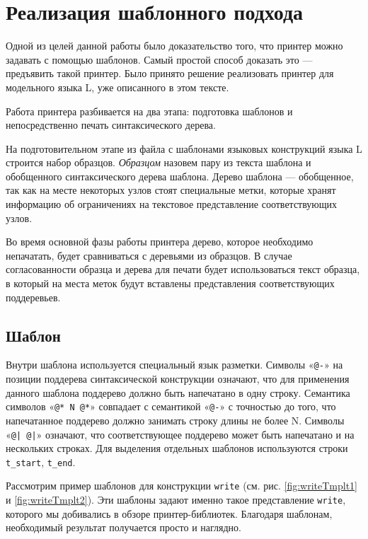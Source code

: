 \section{Реализация шаблонного подхода}

Одной из целей данной работы было доказательство того, что принтер можно задавать с помощью шаблонов.
Самый простой способ доказать это --- предъявить такой принтер. Было принято решение реализовать принтер для модельного языка L, уже описанного в этом тексте.

Работа принтера разбивается на два этапа: подготовка шаблонов и непосредственно печать синтаксического дерева.

На подготовительном этапе из файла с шаблонами языковых конструкций языка L строится набор образцов. \textit{Образцом} назовем пару из текста шаблона и обобщенного синтаксического дерева шаблона. Дерево шаблона --- обобщенное, так как на месте некоторых узлов стоят специальные метки, которые хранят информацию об ограничениях на текстовое представление соответствующих узлов.

Во время основной фазы работы принтера дерево, которое необходимо непачатать, будет сравниваться с деревьями из образцов. В случае согласованности образца и дерева для печати будет использоваться текст образца, в который на места меток будут вставлены представления соответствующих поддеревьев.

\subsection{Шаблон}

Внутри шаблона используется специальный язык разметки. Символы «\lstinline{@-}» на позиции поддерева синтаксической конструкции означают, что для применения данного шаблона поддерево должно быть напечатано в одну строку. Семантика символов «\lstinline{@* N @*}» совпадает с семантикой «\lstinline{@-}» с точностью до того, что напечатанное поддерево должно занимать строку длины не более N. Символы «\lstinline{@| @|}» означают, что соответствующее поддерево может быть напечатано и на нескольких строках. Для выделения отдельных шаблонов используются строки \lstinline{t_start}, \lstinline{t_end}.

Рассмотрим пример шаблонов для конструкции \lstinline{write} (см. рис. \ref{fig:writeTmplt1} и \ref{fig:writeTmplt2}).
Эти шаблоны задают именно такое представление \lstinline{write}, которого мы добивались в обзоре принтер-библиотек.
Благодаря шаблонам, необходимый результат получается просто и наглядно.


